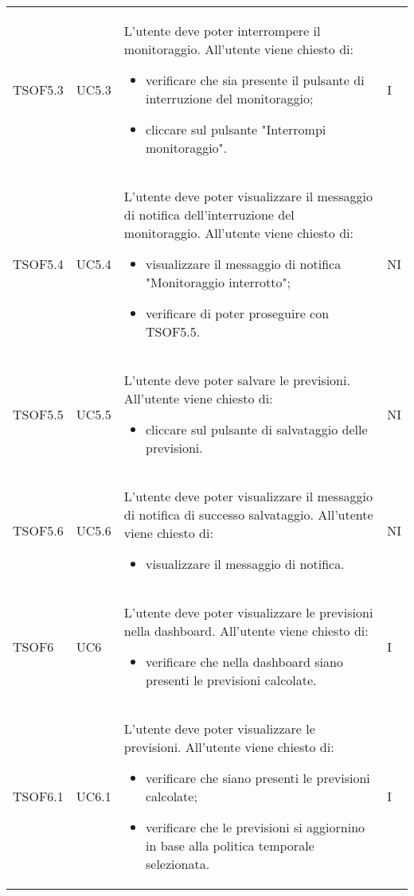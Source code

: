 \begin{longtable}{C{2.5cm} C{2.5cm} L{8cm} C{2cm}}
TSOF5.3 &
UC5.3 &
L'utente deve poter interrompere il monitoraggio. All'utente viene chiesto di:
\begin{itemize}
	\item verificare che sia presente il pulsante di interruzione del monitoraggio;
	\item cliccare sul pulsante "Interrompi monitoraggio".
\end{itemize}&
I \\

TSOF5.4 &
UC5.4 &
L'utente deve poter visualizzare il messaggio di notifica dell'interruzione del monitoraggio. All'utente viene chiesto di:
\begin{itemize}
	\item visualizzare il messaggio di notifica "Monitoraggio interrotto";
	\item verificare di poter proseguire con TSOF5.5.
\end{itemize}&
NI \\

TSOF5.5 &
UC5.5 &
L'utente deve poter salvare le previsioni. All'utente viene chiesto di:
\begin{itemize}
	\item cliccare sul pulsante di salvataggio delle previsioni.
\end{itemize}&
NI \\

TSOF5.6 &
UC5.6 &
L'utente deve poter visualizzare il messaggio di notifica di successo salvataggio. All'utente viene chiesto di:
\begin{itemize}
	\item visualizzare il messaggio di notifica.
\end{itemize}&
NI \\

TSOF6 &
UC6 &
L'utente deve poter visualizzare le previsioni nella dashboard. All'utente viene chiesto di:
\begin{itemize}
	\item verificare che nella dashboard siano presenti le previsioni calcolate.
\end{itemize}&
I \\

TSOF6.1 &
UC6.1 &
L'utente deve poter visualizzare le previsioni. All'utente viene chiesto di:
\begin{itemize}
	\item verificare che siano presenti le previsioni calcolate;
	\item verificare che le previsioni si aggiornino in base alla politica temporale selezionata.
\end{itemize}&
I \\


\end{longtable}
